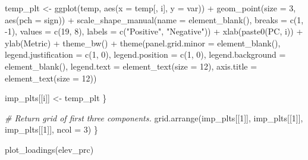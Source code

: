 \documentclass[
]{article}
\newenvironment{Shaded}{\begin{snugshade}}{\end{snugshade}}
\newcommand{\AttributeTok}[1]{\textcolor[rgb]{0.77,0.63,0.00}{#1}}
\newcommand{\CommentTok}[1]{\textcolor[rgb]{0.56,0.35,0.01}{\textit{#1}}}
\newcommand{\DecValTok}[1]{\textcolor[rgb]{0.00,0.00,0.81}{#1}}
\newcommand{\FunctionTok}[1]{\textcolor[rgb]{0.00,0.00,0.00}{#1}}
\newcommand{\NormalTok}[1]{#1}
\newcommand{\OtherTok}[1]{\textcolor[rgb]{0.56,0.35,0.01}{#1}}
\newcommand{\SpecialCharTok}[1]{\textcolor[rgb]{0.00,0.00,0.00}{#1}}
\newcommand{\StringTok}[1]{\textcolor[rgb]{0.31,0.60,0.02}{#1}}
\begin{document}
\begin{Shaded}
\begin{Highlighting}[]
\NormalTok{    temp\_plt }\OtherTok{\textless{}{-}} \FunctionTok{ggplot}\NormalTok{(temp, }\FunctionTok{aes}\NormalTok{(}\AttributeTok{x =}\NormalTok{ temp[, i], }\AttributeTok{y =}\NormalTok{ var)) }\SpecialCharTok{+}
      \FunctionTok{geom\_point}\NormalTok{(}\AttributeTok{size =} \DecValTok{3}\NormalTok{, }\FunctionTok{aes}\NormalTok{(}\AttributeTok{pch =}\NormalTok{ sign)) }\SpecialCharTok{+}
      \FunctionTok{scale\_shape\_manual}\NormalTok{(}\AttributeTok{name =} \FunctionTok{element\_blank}\NormalTok{(),}
                         \AttributeTok{breaks =} \FunctionTok{c}\NormalTok{(}\DecValTok{1}\NormalTok{, }\SpecialCharTok{{-}}\DecValTok{1}\NormalTok{),}
                         \AttributeTok{values =} \FunctionTok{c}\NormalTok{(}\DecValTok{19}\NormalTok{, }\DecValTok{8}\NormalTok{),}
                         \AttributeTok{labels =} \FunctionTok{c}\NormalTok{(}\StringTok{"Positive"}\NormalTok{, }\StringTok{"Negative"}\NormalTok{)) }\SpecialCharTok{+}
      \FunctionTok{xlab}\NormalTok{(}\FunctionTok{paste0}\NormalTok{(}\StringTok{\textquotesingle{}PC\textquotesingle{}}\NormalTok{, i)) }\SpecialCharTok{+}
      \FunctionTok{ylab}\NormalTok{(}\StringTok{\textquotesingle{}Metric\textquotesingle{}}\NormalTok{) }\SpecialCharTok{+}
      \FunctionTok{theme\_bw}\NormalTok{() }\SpecialCharTok{+}
      \FunctionTok{theme}\NormalTok{(}\AttributeTok{panel.grid.minor =} \FunctionTok{element\_blank}\NormalTok{(),}
            \AttributeTok{legend.justification =} \FunctionTok{c}\NormalTok{(}\DecValTok{1}\NormalTok{, }\DecValTok{0}\NormalTok{), }
            \AttributeTok{legend.position =} \FunctionTok{c}\NormalTok{(}\DecValTok{1}\NormalTok{, }\DecValTok{0}\NormalTok{),}
            \AttributeTok{legend.background =} \FunctionTok{element\_blank}\NormalTok{(),}
            \AttributeTok{legend.text =} \FunctionTok{element\_text}\NormalTok{(}\AttributeTok{size =} \DecValTok{12}\NormalTok{),}
            \AttributeTok{axis.title =} \FunctionTok{element\_text}\NormalTok{(}\AttributeTok{size =} \DecValTok{12}\NormalTok{))}
    
\NormalTok{    imp\_plts[[i]] }\OtherTok{\textless{}{-}}\NormalTok{ temp\_plt}
\NormalTok{  \}}
  
  \CommentTok{\# Return grid of first three components.}
  \FunctionTok{grid.arrange}\NormalTok{(imp\_plts[[}\DecValTok{1}\NormalTok{]], imp\_plts[[}\DecValTok{1}\NormalTok{]], imp\_plts[[}\DecValTok{1}\NormalTok{]], }\AttributeTok{ncol =} \DecValTok{3}\NormalTok{)}
\NormalTok{\}}

\FunctionTok{plot\_loadings}\NormalTok{(elev\_prc)}
\end{Highlighting}
\end{Shaded}
\end{document}
